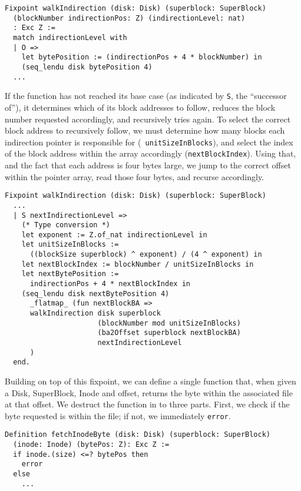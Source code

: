 \documentclass[nocopyrightspace]{sigplanconf}
\begin{document}
\begin{lstlisting}
Fixpoint walkIndirection (disk: Disk) (superblock: SuperBlock)
  (blockNumber indirectionPos: Z) (indirectionLevel: nat) 
  : Exc Z :=
  match indirectionLevel with
  | O => 
    let bytePosition := (indirectionPos + 4 * blockNumber) in
    (seq_lendu disk bytePosition 4)
  ...
\end{lstlisting}

If the function has not reached its base case (as indicated by {\tt S}, the
``successor of''), it determines which of its block addresses to follow,
reduces the block number requested accordingly, and recursively tries again.
To select the correct block address to recursively follow, we must determine
how many blocks each indirection pointer is responsible for ({\tt
unitSizeInBlocks}), and select the index of the block address within the array
accordingly ({\tt nextBlockIndex}). Using that, and the fact that each address
is four bytes large, we jump to the correct offset within the pointer array,
read those four bytes, and recurse accordingly.

\begin{lstlisting}
Fixpoint walkIndirection (disk: Disk) (superblock: SuperBlock)
  ...
  | S nextIndirectionLevel =>
    (* Type conversion *)
    let exponent := Z.of_nat indirectionLevel in
    let unitSizeInBlocks := 
      ((blockSize superblock) ^ exponent) / (4 ^ exponent) in
    let nextBlockIndex := blockNumber / unitSizeInBlocks in
    let nextBytePosition := 
      indirectionPos + 4 * nextBlockIndex in
    (seq_lendu disk nextBytePosition 4) 
      _flatmap_ (fun nextBlockBA =>
      walkIndirection disk superblock 
                      (blockNumber mod unitSizeInBlocks)
                      (ba2Offset superblock nextBlockBA)
                      nextIndirectionLevel
      )
  end.
\end{lstlisting}

Building on top of this fixpoint, we can define a single function that, when
given a Disk, SuperBlock, Inode and offset, returns the byte within the
associated file at that offset. We destruct the function in to three parts.
First, we check if the byte requested is within the file; if not, we
immediately {\tt error}.

\begin{lstlisting}
Definition fetchInodeByte (disk: Disk) (superblock: SuperBlock)
  (inode: Inode) (bytePos: Z): Exc Z :=
  if inode.(size) <=? bytePos then 
    error
  else 
    ...
\end{lstlisting}
\end{document}
